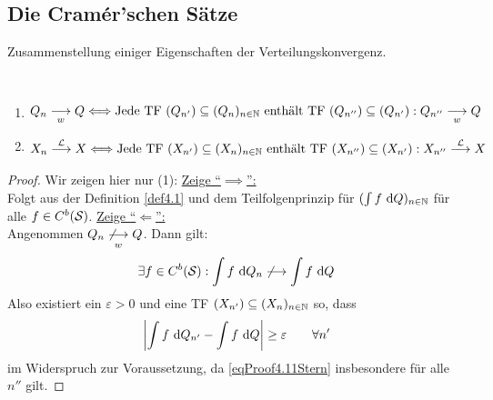 \subsection*{Die Cramér'schen Sätze}
Zusammenstellung einiger Eigenschaften der Verteilungskonvergenz.

\begin{satz}\label{satz4.11}\
\begin{enumerate}[label=(\arabic*)]
\item $\begin{aligned}
Q_n\stackrelnew{w}{}{\longrightarrow} Q
\Longleftrightarrow
\text{Jede TF }(Q_{n'})\subseteq(Q_n)_{n\in\N}\text{ enthält TF }(Q_{n''})\subseteq(Q_{n'}):Q_{n''}\stackrelnew{w}{}{\longrightarrow} Q
\end{aligned}$
\item $\begin{aligned}
X_n\stackrel{\L}{\longrightarrow} X\Longleftrightarrow\text{Jede TF }(X_{n'})\subseteq(X_n)_{n\in\N}\text{ enthält TF }(X_{n''})\subseteq(X_{n'}):X_{n''}\stackrel{\L}{\longrightarrow} X
\end{aligned}$
\end{enumerate}
\end{satz}
\begin{proof}
Wir zeigen hier nur (1):\nl
\underline{Zeige ``$\implies$'':}\\
Folgt aus der Definition \ref{def4.1} und dem Teilfolgenprinzip für $(\int f\d Q)_{n\in\N}$ für alle $f\in C^b(\S)$.\nl
\underline{Zeige ``$\Longleftarrow$'':}\\
Angenommen $Q_n\stackrelnew{w}{}{\not\longrightarrow} Q$. Dann gilt:
\begin{align*}
\exists f\in C^b(\S):\int\limits f\d Q_n\not\longrightarrow\int\limits f\d Q
\end{align*}
Also existiert ein $\varepsilon>0$ und eine TF $(X_{n'})\subseteq(X_n)_{n\in\N}$ so, dass
\begin{align}\label{eqProof4.11Stern}
\left|\int\limits f\d Q_{n'}-\int\limits f\d Q\right|\geq\varepsilon\qquad\forall n'
\end{align}
im Widerspruch zur Voraussetzung, da \eqref{eqProof4.11Stern} insbesondere für alle $n''$ gilt.
\end{proof}

